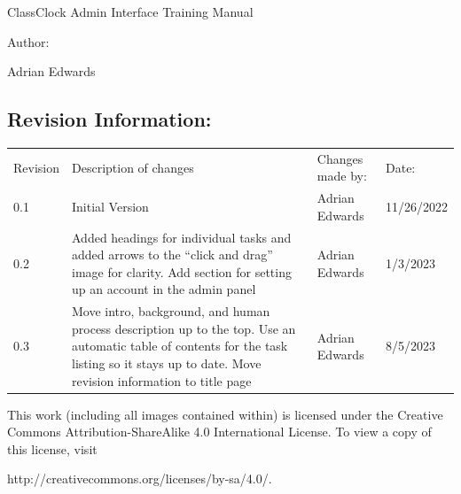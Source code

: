 \documentclass{article}
\author{Adrian Edwards}
\date{2023-08-06}
\begin{document}
\clearpage
{
ClassClock Admin Interface Training Manual}

{
Author:}

{
Adrian Edwards}


\bigskip


\bigskip


\bigskip


\bigskip

\subsection{Revision Information:}
\begin{flushleft}
\tablefirsthead{}
\tablehead{}
\tabletail{}
\tablelasttail{}
\begin{supertabular}{m{0.5462598in}m{3.35316in}m{1.4233599in}m{0.8615598in}}
{ Revision} &
{ Description of changes} &
{ Changes made by:} &
{ Date:}\\
{ 0.1} &
{ Initial Version} &
{ Adrian Edwards} &
{ 11/26/2022}\\
{ 0.2} &
{ Added headings for individual tasks and added arrows to the “click and drag” image for
clarity. Add section for setting up an account in the admin panel} &
{ Adrian Edwards} &
{ 1/3/2023}\\
{ 0.3} &
{ Move intro, background, and human process description up to the top. Use an automatic table of
contents for the task listing so it stays up to date. Move revision information to title page} &
{ Adrian Edwards} &
{ 8/5/2023}\\
\end{supertabular}
\end{flushleft}

\bigskip


\bigskip


\bigskip

{
This work (including all images contained within) is licensed under the Creative Commons Attribution-ShareAlike 4.0
International License. To view a copy of this license, visit}

{
http://creativecommons.org/licenses/by-sa/4.0/.}
\end{document}
